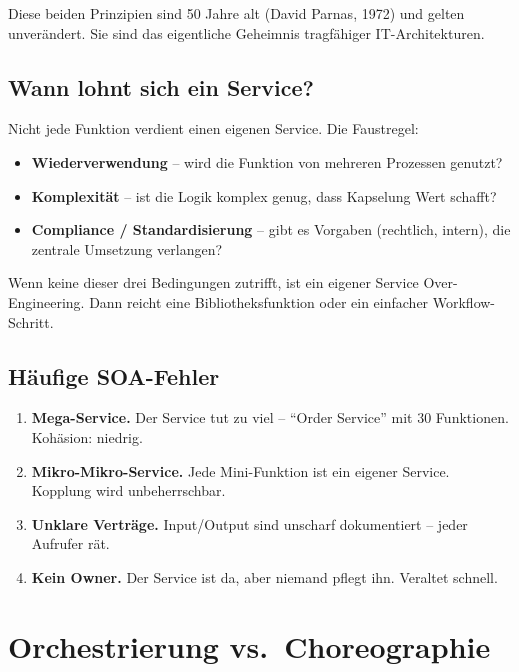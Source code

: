 \documentclass[11pt,a4paper,oneside]{article}
\newcommand{\fachbegriff}[1]{\textbf{#1}}
\begin{document}
Diese beiden Prinzipien sind 50 Jahre alt (David Parnas, 1972) und gelten unverändert. Sie sind das eigentliche Geheimnis tragfähiger IT-Architekturen.

\subsection{Wann lohnt sich ein Service?}

Nicht jede Funktion verdient einen eigenen Service. Die Faustregel:

\begin{itemize}
  \item \textbf{Wiederverwendung} -- wird die Funktion von mehreren Prozessen genutzt?
  \item \textbf{Komplexität} -- ist die Logik komplex genug, dass Kapselung Wert schafft?
  \item \textbf{Compliance / Standardisierung} -- gibt es Vorgaben (rechtlich, intern), die zentrale Umsetzung verlangen?
\end{itemize}

Wenn keine dieser drei Bedingungen zutrifft, ist ein eigener Service Over-Engineering. Dann reicht eine Bibliotheksfunktion oder ein einfacher Workflow-Schritt.

\subsection{Häufige SOA-Fehler}

\begin{enumerate}
  \item \fachbegriff{Mega-Service.} Der Service tut zu viel -- ``Order Service'' mit 30 Funktionen. Kohäsion: niedrig.
  \item \fachbegriff{Mikro-Mikro-Service.} Jede Mini-Funktion ist ein eigener Service. Kopplung wird unbeherrschbar.
  \item \fachbegriff{Unklare Verträge.} Input/Output sind unscharf dokumentiert -- jeder Aufrufer rät.
  \item \fachbegriff{Kein Owner.} Der Service ist da, aber niemand pflegt ihn. Veraltet schnell.
\end{enumerate}

\section{Orchestrierung vs.\ Choreographie}
\end{document}
